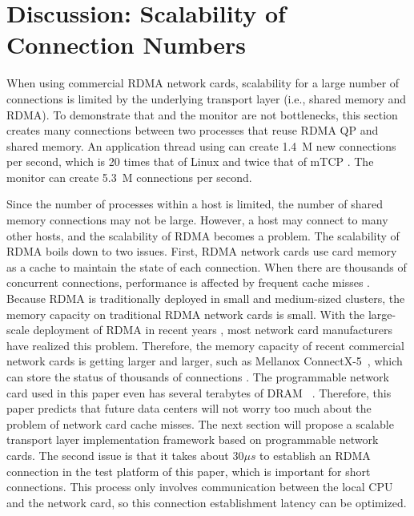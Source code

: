 \section{Discussion: Scalability of Connection Numbers}
\label{socksdirect:sec:discussion}

When using commercial RDMA network cards, \sys {} scalability for a large number of connections is limited by the underlying transport layer (i.e., shared memory and RDMA).
To demonstrate that \libipc {} and the monitor are not bottlenecks, this section creates many connections between two processes that reuse RDMA QP and shared memory. An application thread using \libipc {} can create 1.4~M new connections per second, which is 20 times that of Linux and twice that of mTCP \cite {jeong2014mtcp}. The monitor can create 5.3~M connections per second.

Since the number of processes within a host is limited, the number of shared memory connections may not be large.
However, a host may connect to many other hosts, and the scalability of RDMA becomes a problem.
The scalability of RDMA boils down to two issues.
First, RDMA network cards use card memory as a cache to maintain the state of each connection. When there are thousands of concurrent connections, performance is affected by frequent cache misses \cite {mprdma,kaminsky2016design,kalia2018datacenter}.
Because RDMA is traditionally deployed in small and medium-sized clusters, the memory capacity on traditional RDMA network cards is small.
With the large-scale deployment of RDMA in recent years \cite {guo2016rdma}, most network card manufacturers have realized this problem.
Therefore, the memory capacity of recent commercial network cards is getting larger and larger, such as Mellanox ConnectX-5~\cite{connectx-5}, which can store the status of thousands of connections \cite {kalia2018datacenter}. The programmable network card used in this paper even has several terabytes of DRAM~ \cite {mellanox-innova,mellanox-bluefield,smartnic}.
Therefore, this paper predicts that future data centers will not worry too much about the problem of network card cache misses. The next section will propose a scalable transport layer implementation framework based on programmable network cards.
The second issue is that it takes about $30 \mu s$ to establish an RDMA connection in the test platform of this paper, which is important for short connections. This process only involves communication between the local CPU and the network card, so this connection establishment latency can be optimized.

